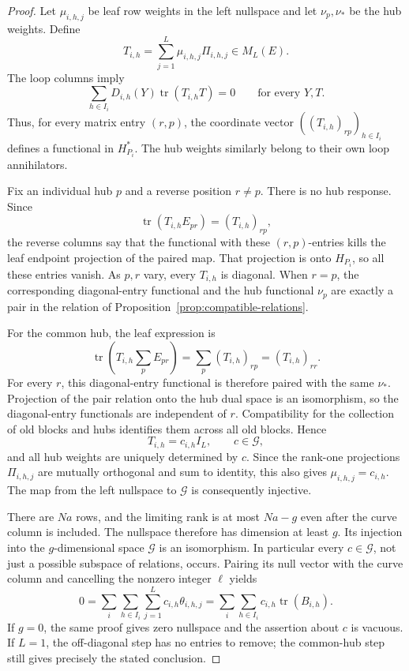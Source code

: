 \begin{proof}
Let \(\mu_{i,h,j}\) be leaf row weights in the left nullspace
and let \(\nu_p,\nu_*\) be the hub weights. Define
\[
 T_{i,h}=\sum_{j=1}^L\mu_{i,h,j}\Pi_{i,h,j}\in M_L(E).
\]
The loop columns imply
\[
 \sum_{h\in I_i}D_{i,h}(Y)
          \operatorname{tr}(T_{i,h}T)=0
 \qquad\text{for every }Y,T.
\]
Thus, for every matrix entry \((r,p)\), the coordinate vector
\( ((T_{i,h})_{rp})_{h\in I_i}\) defines a functional in
\(H_{P_i}^*\). The hub weights similarly belong to their own
loop annihilators.

Fix an individual hub \(p\) and a reverse position \(r\ne p\).
There is no hub response. Since
\[
 \operatorname{tr}(T_{i,h}E_{pr})=(T_{i,h})_{rp},
\]
the reverse columns say that the functional with these
\((r,p)\)-entries kills the leaf endpoint projection of the paired
map. That projection is onto \(H_{P_i}\), so all these entries
vanish. As \(p,r\) vary, every \(T_{i,h}\) is diagonal. When
\(r=p\), the corresponding diagonal-entry functional and the
hub functional \(\nu_p\) are exactly a pair in the relation of
Proposition~\ref{prop:compatible-relations}.

For the common hub, the leaf expression is
\[
 \operatorname{tr}\left(T_{i,h}\sum_pE_{pr}\right)
   =\sum_p(T_{i,h})_{rp}=(T_{i,h})_{rr}.
\]
For every \(r\), this diagonal-entry functional is therefore
paired with the same \(\nu_*\). Projection of the pair relation
onto the hub dual space is an isomorphism, so the diagonal-entry
functionals are independent of \(r\). Compatibility for the
collection of old blocks and hubs identifies them across all old
blocks. Hence
\[
 T_{i,h}=c_{i,h}I_L,
 \qquad c\in\mathcal G,
\]
and all hub weights are uniquely determined by \(c\). Since the
rank-one projections \(\Pi_{i,h,j}\) are mutually orthogonal
and sum to identity, this also gives
\(\mu_{i,h,j}=c_{i,h}\). The map from the left nullspace to
\(\mathcal G\) is consequently injective.

There are \(Na\) rows, and the limiting rank is at most \(Na-g\)
even after the curve column is included. The nullspace therefore
has dimension at least \(g\). Its injection into the
\(g\)-dimensional space \(\mathcal G\) is an isomorphism.
In particular every \(c\in\mathcal G\), not just a possible
subspace of relations, occurs. Pairing its null vector with the
curve column and cancelling the nonzero integer \(\ell\) yields
\[
 0=\sum_i\sum_{h\in I_i}\sum_{j=1}^L
       c_{i,h}\theta_{i,h,j}
  =\sum_i\sum_{h\in I_i}c_{i,h}\operatorname{tr}(B_{i,h}).
\]
If \(g=0\), the same proof gives zero nullspace and the assertion
about \(c\) is vacuous. If \(L=1\), the off-diagonal step has
no entries to remove; the common-hub step still gives precisely
the stated conclusion.
\end{proof}

